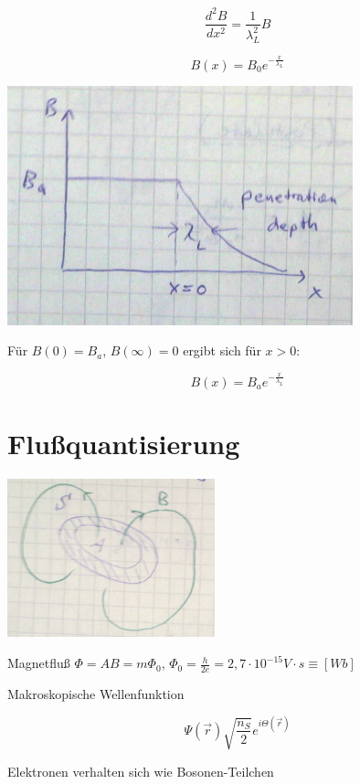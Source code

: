 \[\frac{d^2 B}{dx^2} = \frac{1}{\lambda^2_L}B\]


\[B(x) = B_0e^{-\frac{x}{\lambda_L}}\]


\includegraphics[width=0.75\textwidth]{kap13_08.png}


Für \(B(0) = B_a\), \(B(\infty) = 0\) ergibt sich für \(x>0\):

\[B(x) = B_a e^{-\frac{x}{\lambda_L}}\]


\section{Flußquantisierung}

\includegraphics[width=0.45\textwidth]{kap13_09.png}


Magnetfluß \(\Phi = AB = m\Phi_0\), \(\Phi_0 = \frac{h}{2e}=2,7\cdot 10^{-15}V\cdot s\equiv [Wb] \)


Makroskopische Wellenfunktion

\[\Psi(\vec r) \sqrt{\frac{n_S}{2}} e^{i\Theta(\vec r)}\]

Elektronen verhalten sich wie Bosonen-Teilchen



